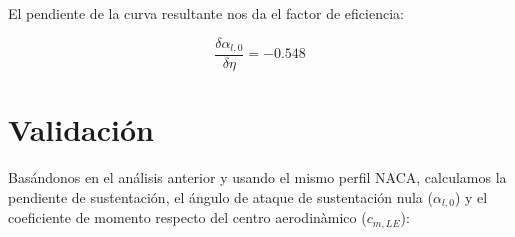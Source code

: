 \documentclass[10pt, a4paper]{article}
\begin{document}
El pendiente de la curva resultante nos da el factor de eficiencia:

\[ \frac{\delta\alpha_{l,0}}{\delta{\eta}} = -0.548 \]

\section{Validación}

Basándonos en el análisis anterior y usando el mismo perfil NACA, calculamos la pendiente de sustentación, el ángulo de ataque de sustentación nula ($\alpha_{l,0}$) y el coeficiente de momento respecto del centro aerodinàmico ($c_{m,LE}$):

\end{document}
